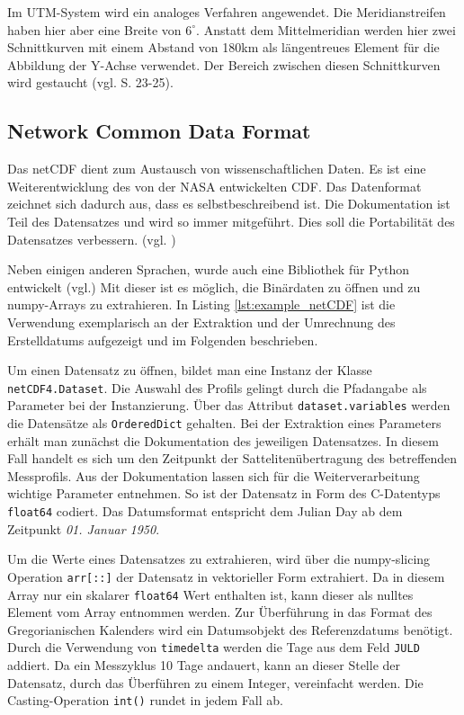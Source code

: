 Im UTM-System wird ein analoges Verfahren angewendet. Die Meridianstreifen haben hier aber eine Breite von $6^\circ$. Anstatt dem Mittelmeridian werden hier zwei Schnittkurven mit einem Abstand von 180km als längentreues Element für die Abbildung der Y-Achse verwendet. Der Bereich zwischen diesen Schnittkurven wird gestaucht (vgl. \cite{witte2011vermessungskunde} S. 23-25).



\pagebreak
    \subsection{Network Common Data Format}

    Das \gls{netCDF} dient zum Austausch von wissenschaftlichen Daten. Es ist eine Weiterentwicklung des von der NASA entwickelten \gls{CDF}. Das Datenformat zeichnet sich dadurch aus, dass es selbstbeschreibend ist. Die Dokumentation ist Teil des Datensatzes und wird so immer  mitgeführt. Dies soll die Portabilität des Datensatzes verbessern.  (vgl. \cite{FishernetCDF})

    Neben einigen anderen Sprachen, wurde auch eine Bibliothek für Python entwickelt (vgl.\cite{netCDF4}) Mit dieser ist es möglich, die Binärdaten zu öffnen und zu numpy-Arrays zu extrahieren. In Listing \ref{lst:example_netCDF} ist die Verwendung exemplarisch an der Extraktion und der Umrechnung des Erstelldatums  aufgezeigt und im Folgenden beschrieben.


    Um einen Datensatz zu öffnen, bildet man eine Instanz der Klasse \texttt{netCDF4.Dataset}. Die Auswahl des Profils gelingt durch die Pfadangabe als Parameter bei der Instanzierung.
    Über das Attribut \texttt{dataset.variables} werden die Datensätze als \texttt{OrderedDict} gehalten. Bei der Extraktion eines Parameters erhält man zunächst die Dokumentation des jeweiligen Datensatzes. In diesem Fall handelt es sich um den Zeitpunkt der Sattelitenübertragung des betreffenden Messprofils.
    Aus der Dokumentation lassen sich für die Weiterverarbeitung wichtige Parameter entnehmen.
    So ist der Datensatz in Form des C-Datentyps \texttt{float64} codiert. Das Datumsformat entspricht dem \gls{Julian Day} ab dem Zeitpunkt \textit{01. Januar 1950}.

    Um die Werte eines Datensatzes zu extrahieren, wird über die numpy-slicing Operation \texttt{arr[::]} der Datensatz in vektorieller Form extrahiert. Da in diesem Array nur ein skalarer \texttt{float64} Wert enthalten ist, kann dieser als nulltes Element vom Array entnommen werden.
    Zur Überführung in das Format des Gregorianischen Kalenders wird ein Datumsobjekt des Referenzdatums benötigt. Durch die Verwendung von \texttt{timedelta} werden die Tage aus dem Feld \texttt{JULD} addiert. Da ein Messzyklus 10 Tage andauert, kann an dieser Stelle der Datensatz, durch das Überführen zu einem Integer, vereinfacht werden. Die Casting-Operation \texttt{int()} rundet in jedem Fall ab.

